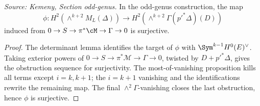\begin{proposition}
  \label{prop:kemeny_odd_phi_surjective}
  \textit{Source: Kemeny, Section odd-genus.}
  In the odd-genus construction, the map
  \[
    \phi:H^2(\wedge^{k+2}M_L(\Delta))\to
    H^2(\wedge^{k+2}\Gamma(p'^*\Delta)(D))
  \]
  induced from \(0\to S\to\pi^*\cM\to\Gamma\to0\) is surjective.
  \end{proposition}
\begin{proof}
  The determinant lemma identifies the target of \(\phi\) with
  \(\Sym^{k-1}H^0(E)^\vee\).  Taking exterior powers of
  \(0\to S\to\pi^*\mathcal M\to\Gamma\to0\), twisted by \(D+p'^*\Delta\), gives
  the obstruction sequence for surjectivity.  The most-of-vanishing proposition
  kills all terms except \(i=k,k+1\); the \(i=k+1\) vanishing and the
  identifications rewrite the remaining map.  The final
  \(\wedge^2\Gamma\)-vanishing closes the last obstruction, hence \(\phi\) is
  surjective.
\end{proof}

